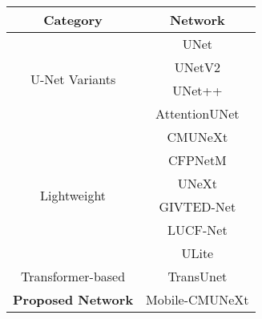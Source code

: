 \begin{tabular}{|c|c|}
    \hline
    \textbf{Category} & \textbf{Network} \\
    \hline
    \multirow{4}{*}{U-Net Variants} & UNet \\
                                & UNetV2 \\
                                & UNet++ \\
                                & AttentionUNet \\ 
    \hline
    \multirow{6}{*}{Lightweight} & CMUNeXt \\
                                 & CFPNetM \\
                                 & UNeXt \\
                                 & GIVTED-Net \\
                                 & LUCF-Net \\
                                 & ULite \\
    \hline
    Transformer-based & TransUnet \\ 
    \hline
    \textbf{Proposed Network} & Mobile-CMUNeXt \\ 
    \hline
\end{tabular}